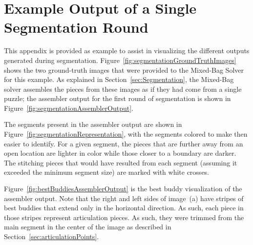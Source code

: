\chapter{Example Output of a Single Segmentation Round\label{app:segmentedOutput}}

This appendix is provided as example to assist in visualizing the different outputs generated during segmentation.  Figure~\ref{fig:segmentationGroundTruthImages} shows the two ground-truth images that were provided to the Mixed-Bag Solver for this example.  As explained in Section~\ref{sec:Segmentation}, the Mixed-Bag solver assembles the pieces from these images as if they had come from a single puzzle; the assembler output for the first round of segmentation is shown in Figure~\ref{fig:segmentationAssemblerOutput}.

The segments present in the assembler output are shown in Figure~\ref{fig:segmentationRepresentation}, with the segments colored to make then easier to identify.  For a given segment, the pieces that are further away from an open location are lighter in color while those closer to a boundary are darker.  The stitching pieces that would have resulted from each segment (assuming it exceeded the minimum segment size) are marked with white crosses.

Figure~\ref{fig:bestBuddiesAssemblerOutput} is the best buddy visualization of the assembler output.  Note that the right and left sides of image~(a) have stripes of best buddies that extend only in the horizontal direction.  As such, each piece in those stripes represent articulation pieces.  As such, they were trimmed from the main segment in the center of the image as described in Section~\ref{sec:articulationPoints}.

